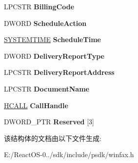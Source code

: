 \begin{DoxyCompactItemize}
L\+P\+C\+S\+TR {\bfseries Billing\+Code}
\item 
\mbox{\label{struct___f_a_x___j_o_b___p_a_r_a_m_a_a8c24cacaa3b5805437c0887ae02058ee}} 
D\+W\+O\+RD {\bfseries Schedule\+Action}
\item 
\mbox{\label{struct___f_a_x___j_o_b___p_a_r_a_m_a_a85c58f34faf260e7ed502540da702f16}} 
\hyperlink{struct___s_y_s_t_e_m_t_i_m_e}{S\+Y\+S\+T\+E\+M\+T\+I\+ME} {\bfseries Schedule\+Time}
\item 
\mbox{\label{struct___f_a_x___j_o_b___p_a_r_a_m_a_a41a34f53cd9fde8daf84e924c4ec6ddc}} 
D\+W\+O\+RD {\bfseries Delivery\+Report\+Type}
\item 
\mbox{\label{struct___f_a_x___j_o_b___p_a_r_a_m_a_aef678cf273141ce435f9d547717ff22e}} 
L\+P\+C\+S\+TR {\bfseries Delivery\+Report\+Address}
\item 
\mbox{\label{struct___f_a_x___j_o_b___p_a_r_a_m_a_a6f4be408b3b50e4c7ad57a14cc0e0ac5}} 
L\+P\+C\+S\+TR {\bfseries Document\+Name}
\item 
\mbox{\label{struct___f_a_x___j_o_b___p_a_r_a_m_a_a986865b93b8556306f12650b056fd5dc}} 
\hyperlink{interfacevoid}{H\+C\+A\+LL} {\bfseries Call\+Handle}
\item 
\mbox{\label{struct___f_a_x___j_o_b___p_a_r_a_m_a_a0ab16b5a972dd333e50d72aca3d1bf12}} 
D\+W\+O\+R\+D\+\_\+\+P\+TR {\bfseries Reserved} \mbox{[}3\mbox{]}
\end{DoxyCompactItemize}


该结构体的文档由以下文件生成\+:\begin{DoxyCompactItemize}
\item 
E\+:/\+React\+O\+S-\/0../sdk/include/psdk/winfax.\+h\end{DoxyCompactItemize}

